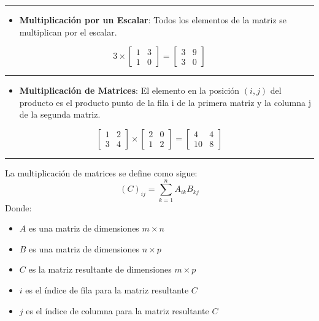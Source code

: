 \documentclass[
  letterpaper,
  DIV=11,
  numbers=noendperiod]{scrartcl}
\providecommand{\tightlist}{%
  \setlength{\itemsep}{0pt}\setlength{\parskip}{0pt}}\usepackage{longtable,booktabs,array}
\begin{document}
\begin{center}\rule{0.5\linewidth}{0.5pt}\end{center}

\begin{itemize}
\tightlist
\item
  \textbf{Multiplicación por un Escalar}: Todos los elementos de la
  matriz se multiplican por el escalar.
\end{itemize}

\[3     \times \begin{bmatrix} 1 & 3 \\ 1 & 0 \end{bmatrix} = \begin{bmatrix} 3 & 9 \\ 3 & 0 \end{bmatrix}\]

\begin{center}\rule{0.5\linewidth}{0.5pt}\end{center}

\begin{itemize}
\tightlist
\item
  \textbf{Multiplicación de Matrices}: El elemento en la posición
  \((i, j)\) del producto es el producto punto de la fila i de la
  primera matriz y la columna j de la segunda matriz.
\end{itemize}

\[ \begin{bmatrix} 1 & 2 \\ 3 & 4 \end{bmatrix}     \times \begin{bmatrix} 2 & 0 \\ 1 & 2 \end{bmatrix} = \begin{bmatrix} 4 & 4 \\ 10 & 8 \end{bmatrix}\]

\begin{center}\rule{0.5\linewidth}{0.5pt}\end{center}

La multiplicación de matrices se define como sigue: \[
(C)_{ij} = \sum_{k=1}^n A_{ik} B_{kj}
\] Donde:

\begin{itemize}
\tightlist
\item
  \(A\) es una matriz de dimensiones \(m \times n\)
\item
  \(B\) es una matriz de dimensiones \(n \times p\)
\item
  \(C\) es la matriz resultante de dimensiones \(m \times p\)
\item
  \(i\) es el índice de fila para la matriz resultante \(C\)
\item
  \(j\) es el índice de columna para la matriz resultante \(C\)
\end{itemize}
\end{document}
